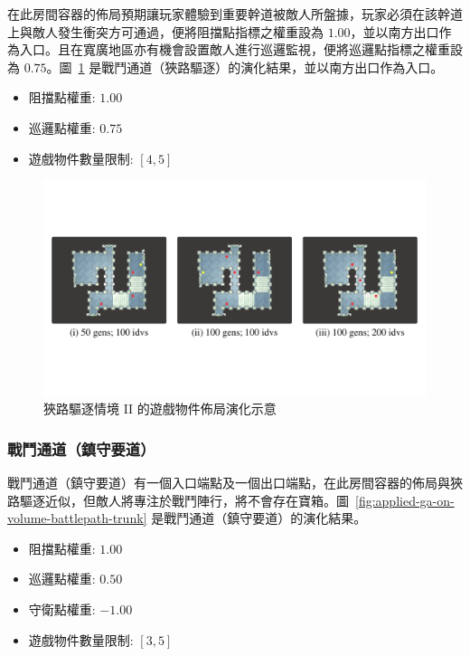 在此房間容器的佈局預期讓玩家體驗到重要幹道被敵人所盤據，玩家必須在該幹道上與敵人發生衝突方可通過，便將阻擋點指標之權重設為 $1.00$，並以南方出口作為入口。且在寬廣地區亦有機會設置敵人進行巡邏監視，便將巡邏點指標之權重設為 $0.75$。圖~\ref{fig:applied-ga-on-volume-battlepath-narrow-i} 是戰鬥通道（狹路驅逐）的演化結果，並以南方出口作為入口。

\begin{itemize}
  \setlength\itemsep{-0.5em}
  \item 阻擋點權重: $1.00$
  \item 巡邏點權重: $0.75$
  \item 遊戲物件數量限制: $[4, 5]$
\end{itemize}

\begin{figure}[H]
  \begin{center}
    \includegraphics[width=1.0\textwidth]{figures/applied-ga-on-volume-battlepath-narrow-i.pdf}
    \caption{狹路驅逐情境 II 的遊戲物件佈局演化示意} 
    \label{fig:applied-ga-on-volume-battlepath-narrow-i}
  \end{center}
\end{figure}

\subsubsection{戰鬥通道（鎮守要道）}
\label{sssec:method-segments-appliedonvolumes-battlepath-trunk}

戰鬥通道（鎮守要道）有一個入口端點及一個出口端點，在此房間容器的佈局與狹路驅逐近似，但敵人將專注於戰鬥陣行，將不會存在寶箱。圖~\ref{fig:applied-ga-on-volume-battlepath-trunk} 是戰鬥通道（鎮守要道）的演化結果。

\begin{itemize}
  \setlength\itemsep{-0.5em}
  \item 阻擋點權重: $1.00$
  \item 巡邏點權重: $0.50$
  \item 守衛點權重: $-1.00$
  \item 遊戲物件數量限制: $[3, 5]$
\end{itemize}

